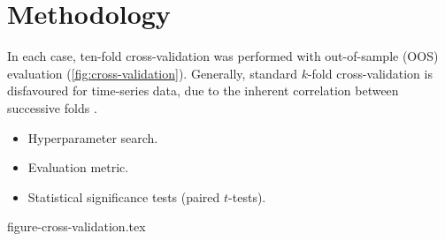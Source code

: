 \documentclass[11pt]{extarticle}
\begin{document}
\section{Methodology}

In each case, ten-fold cross-validation was performed with out-of-sample (OOS)
evaluation (\cref{fig:cross-validation}).
Generally, standard $k$-fold cross-validation is disfavoured for time-series data, due
to the inherent correlation between successive folds \parencite{Bergmeir2018}.

\begin{itemize}
  \item Hyperparameter search.
  \item Evaluation metric.
  \item Statistical significance tests (paired $t$-tests).
\end{itemize}

{figure-cross-validation.tex}

\printbibliography
\end{document}
